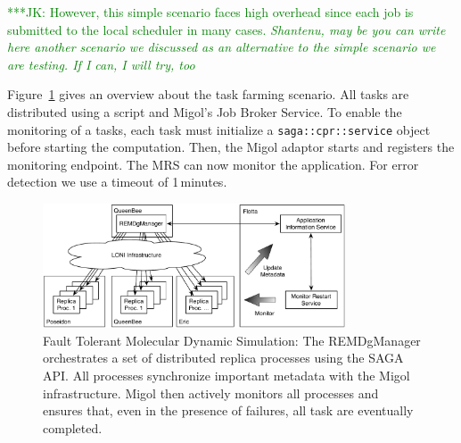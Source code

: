 \documentclass[times, 10pt,twocolumn]{article}
\newcommand{\kimnote}[1]{ {\textcolor{green} { ***JK: #1 }}}
\begin{document}

\kimnote{However, this simple scenario faces high overhead since each job is submitted to the local scheduler in many cases. \it Shantenu, may be you can write here another scenario we discussed as an alternative to the simple scenario we are testing.  If I can, I will try, too } 


\label{sec:exp}       
        
Figure~\ref{fig:saga-taskfarming} gives an overview about the task farming scenario. All tasks are
distributed using a script and Migol's Job Broker Service.
To enable the monitoring of a tasks, each task must initialize a \texttt{saga::cpr::service} object 
before starting the computation.  Then, the Migol adaptor starts and registers the monitoring endpoint. 
The MRS can now monitor the application.  For error detection we use a timeout of 1\,minutes.

\begin{figure}[t]
    \centering
        \includegraphics[width=0.8\textwidth]{saga-taskfarming}
    \caption{Fault Tolerant Molecular Dynamic Simulation: The REMDgManager orchestrates a set of distributed replica processes using the SAGA API. All processes synchronize important metadata with the Migol infrastructure. Migol then actively monitors all processes and ensures that, even in the presence of failures, all task are eventually completed.}
    \label{fig:saga-taskfarming}
\end{figure} 
\end{document}
